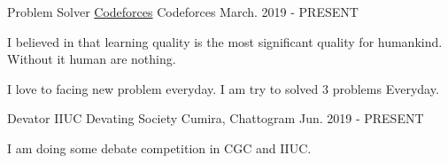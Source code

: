 

\begin{cventries}

  \cventry
    {Problem Solver} %
    {\href{https://codeforces.com/profile/Jahid_hasan_Akash}{Codeforces} } %
    {Codeforces} %
    {March. 2019 - PRESENT} %
    {
      \begin{cvitems} %
        \item {I believed in that learning quality is the most significant quality for humankind. Without it human are nothing. }
        \item {I love to facing new problem everyday. I am try to solved 3 problems Everyday.}
      \end{cvitems}
    }

  \cventry
    {Devator} %
    {IIUC Devating Society} %
    {Cumira, Chattogram} %
    {Jun. 2019 - PRESENT} %
    {
      \begin{cvitems} %
        \item {I am doing some debate competition in CGC and IIUC.}
      \end{cvitems}
    }

\end{cventries}

